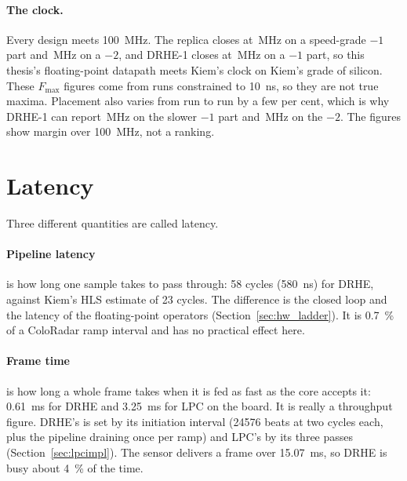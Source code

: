 \paragraph{The clock.} Every design meets \SI{100}{\mega\hertz}. The replica
closes at \,MHz on a speed-grade $-1$ part and
\,MHz on a $-2$, and DRHE-1 closes at
\,MHz on a $-1$ part, so this thesis's floating-point
datapath meets Kiem's clock on Kiem's grade of silicon. These $F_{\max}$
figures come from runs constrained to \SI{10}{\nano\second}, so they are not
true maxima. Placement also varies from run to run by a few per cent, which is
why DRHE-1 can report \,MHz on the slower $-1$ part and
\,MHz on the $-2$. The figures show margin over
\SI{100}{\mega\hertz}, not a ranking.

\section{Latency}
\label{sec:hw_latency}

Three different quantities are called latency.

\paragraph{Pipeline latency} is how long one sample takes to pass through:
58 cycles (\SI{580}{\nano\second}) for DRHE, against Kiem's HLS estimate of
23 cycles. The difference is the closed loop and the latency of the
floating-point operators (Section~\ref{sec:hw_ladder}). It is
\SI{0.7}{\percent} of a ColoRadar ramp interval and has no practical effect
here.

\paragraph{Frame time} is how long a whole frame takes when it is fed as fast
as the core accepts it: \SI{0.61}{\milli\second} for DRHE and
\SI{3.25}{\milli\second} for LPC on the board. It is really a throughput
figure. DRHE's is set by its initiation interval (\num{24576} beats at two
cycles each, plus the pipeline draining once per ramp) and LPC's by its three
passes (Section~\ref{sec:lpcimpl}). The sensor delivers a frame over
\SI{15.07}{\milli\second}, so DRHE is busy about \SI{4}{\percent} of the time.

